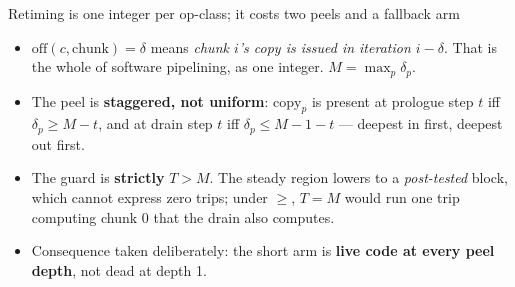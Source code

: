 \documentclass[aspectratio=169,9pt]{beamer}
\newcommand{\tsub}[1]{{\footnotesize\color{gray}#1}}
\newcommand{\key}[1]{\textcolor{acc}{\textbf{#1}}}
\newcommand{\bad}[1]{\textcolor{warn}{\textbf{#1}}}
\begin{document}
\begin{frame}{Retiming is one integer per op-class; it costs two peels and a fallback arm}

\begin{center}
\end{center}

\begin{itemize}
  \item $\mathrm{off}(c,\text{chunk})=\delta$ means \emph{chunk $i$'s copy is issued in iteration $i-\delta$}. That is the whole of software pipelining, as one integer. $M=\max_p \delta_p$.
  \item The peel is \key{staggered, not uniform}: $\mathrm{copy}_p$ is present at prologue step $t$ iff $\delta_p \ge M-t$, and at drain step $t$ iff $\delta_p \le M-1-t$ --- deepest in first, deepest out first.
  \item The guard is \key{strictly} $T>M$. The steady region lowers to a \emph{post-tested} block, which cannot express zero trips; under $\ge$, $T=M$ would run one trip computing chunk 0 that the drain also computes.
  \item Consequence taken deliberately: the short arm is \bad{live code at every peel depth}, not dead at depth 1.
\end{itemize}
\end{frame}
\end{document}
